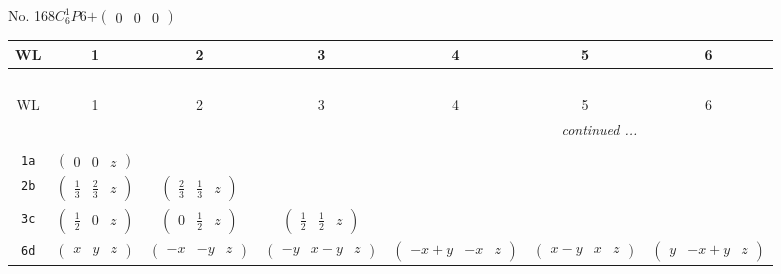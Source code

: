 \documentclass[fleqn,9pt,landscape]{jsarticle}
\begin{document}
\newpage
No. 168\quad$C_{6}^{1}$\quad$P6$\quad[ hexagonal ]\quad$+\begin{pmatrix} 0 & 0 & 0 \end{pmatrix}$
\begin{center}
\renewcommand{\arraystretch}{1.2}
\begin{longtable}{ccccccc}
 \hline \hline
WL & 1 & 2 & 3 & 4 & 5 & 6 \\ \hline \endfirsthead

\multicolumn{6}{l}{\tablename\ \thetable{}} \\
 \hline \hline
WL & 1 & 2 & 3 & 4 & 5 & 6 \\ \hline \endhead

 \hline \hline
\multicolumn{6}{r}{\footnotesize\it continued ...} \\ \endfoot

 \hline \hline
\multicolumn{6}{r}{} \\ \endlastfoot

{\tt 1a} & $ \begin{pmatrix} 0 & 0 & z \end{pmatrix} $ & $  $ & $  $ & $  $ & $  $ & $  $ \\ \hline
{\tt 2b} & $ \begin{pmatrix} \frac{1}{3} & \frac{2}{3} & z \end{pmatrix} $ & $ \begin{pmatrix} \frac{2}{3} & \frac{1}{3} & z \end{pmatrix} $ & $  $ & $  $ & $  $ & $  $ \\ \hline
{\tt 3c} & $ \begin{pmatrix} \frac{1}{2} & 0 & z \end{pmatrix} $ & $ \begin{pmatrix} 0 & \frac{1}{2} & z \end{pmatrix} $ & $ \begin{pmatrix} \frac{1}{2} & \frac{1}{2} & z \end{pmatrix} $ & $  $ & $  $ & $  $ \\ \hline
{\tt 6d} & $ \begin{pmatrix} x & y & z \end{pmatrix} $ & $ \begin{pmatrix} - x & - y & z \end{pmatrix} $ & $ \begin{pmatrix} - y & x - y & z \end{pmatrix} $ & $ \begin{pmatrix} - x + y & - x & z \end{pmatrix} $ & $ \begin{pmatrix} x - y & x & z \end{pmatrix} $ & $ \begin{pmatrix} y & - x + y & z \end{pmatrix} $ \\
\end{longtable}
\end{center}
\end{document}
